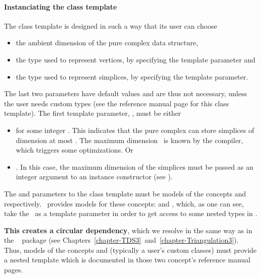\paragraph{Instanciating the class template}

The 
class template is designed in such a way that its user can choose
\begin{itemize}
\item the ambient dimension of the pure complex data structure,
\item the type used to represent vertices, by specifying the 
template parameter and
\item the type used to represent simplices, by specifying the
 template parameter.
\end{itemize}

The last two parameters have default values and are thus not necessary, unless
the user needs custom types (see the reference manual page for this class
template). The first template parameter, , must be either
\begin{itemize}
\item \ccPureGlobalScope{} for some integer \ad. This
indicates that the pure complex can store simplices of dimension at most
\ad. The maximum dimension \ad\ is known by the compiler, which
triggers some optimizations. Or
\item \ccPureGlobalScope{}. In this case, the maximum
dimension of the simplices must be passed as an integer argument to an instance
constructor (see ).
\end{itemize}

The  and  parameters to the class template
must be models of the concepts  and
 respectively. \cgal\ provides models for these
concepts:  and
, which, as one
can see, take the \tds\ as a template parameter in order to get access to
some nested types in \tds.

\textbf{This creates a circular dependency}, which we resolve in the same way
as in the \cgal\  package (see
Chapters~\ref{chapter-TDS3}~and~\ref{chapter-Triangulation3}).
 Thus, models of
the concepts  and
 (typically a
user's custom classes) must provide a nested template  which
is documented in those two concept's reference manual pages.

